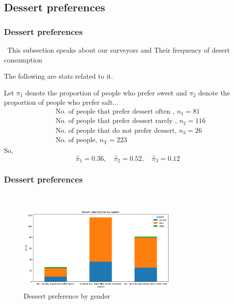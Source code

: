 \documentclass{beamer}
\begin{document}
\subsection{Dessert preferences}
\begin{frame}
    \frametitle{Dessert preferences}\
    This subsection speaks about  our surveyors and Their frequency of desert consumption 
    
    The following are stats related to it.
    
    Let $\pi_1$ denote the proportion of people who prefer sweet and $\pi_2$ denote the proportion of people who prefer salt...
    \begin{align}
        &\text{No. of people that prefer dessert often , } n_{\text{1}} = 81 \\
        &\text{No. of people that prefer dessert rarely , } n_{\text{2}} = 116 \\
        &\text{No. of people that do not prefer dessert, } n_{\text{3}} = 26\\
        &\text{No. of people, } n_{\text{T}} = 223
    \end{align}
    So,
    \begin{equation}
        \hat{\pi}_1  = 0.36, \quad \hat{\pi}_2  = 0.52, \quad \hat{\pi}_3  = 0.12
    \end{equation}
\end{frame}

\begin{frame}
    \frametitle{Dessert preferences }\
    \begin{figure}
    \centering
    \includegraphics[width=0.7\textwidth]{output_99_0.png} %
    \caption{ Dessert preference by gender } %
    \label{fig:Percentage Distribution of Cuisine} %
    \end{figure}
\end{frame}
\end{document}
